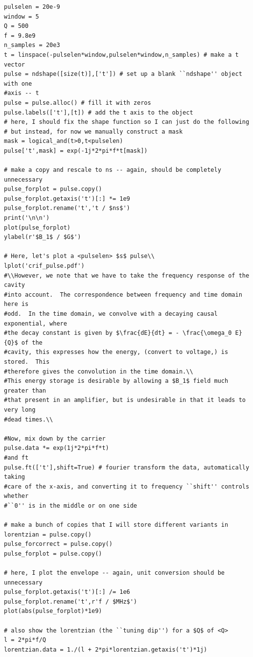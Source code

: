 \begin{lstlisting}
pulselen = 20e-9
window = 5 
Q = 500
f = 9.8e9
n_samples = 20e3
t = linspace(-pulselen*window,pulselen*window,n_samples) # make a t vector
pulse = ndshape([size(t)],['t']) # set up a blank ``ndshape'' object with one
#axis -- t
pulse = pulse.alloc() # fill it with zeros
pulse.labels(['t'],[t]) # add the t axis to the object
# here, I should fix the shape function so I can just do the following
# but instead, for now we manually construct a mask
mask = logical_and(t>0,t<pulselen)
pulse['t',mask] = exp(-1j*2*pi*f*t[mask])

# make a copy and rescale to ns -- again, should be completely unnecessary
pulse_forplot = pulse.copy()
pulse_forplot.getaxis('t')[:] *= 1e9
pulse_forplot.rename('t','t / $ns$')
print('\n\n')
plot(pulse_forplot)
ylabel(r'$B_1$ / $G$')

# Here, let's plot a <pulselen> $s$ pulse\\
lplot('crif_pulse.pdf')
#\\However, we note that we have to take the frequency response of the cavity
#into account.  The correspondence between frequency and time domain here is
#odd.  In the time domain, we convolve with a decaying causal exponential, where
#the decay constant is given by $\frac{dE}{dt} = - \frac{\omega_0 E}{Q}$ of the
#cavity, this expresses how the energy, (convert to voltage,) is stored.  This
#therefore gives the convolution in the time domain.\\
#This energy storage is desirable by allowing a $B_1$ field much greater than
#that present in an amplifier, but is undesirable in that it leads to very long
#dead times.\\

#Now, mix down by the carrier
pulse.data *= exp(1j*2*pi*f*t)
#and ft
pulse.ft(['t'],shift=True) # fourier transform the data, automatically taking
#care of the x-axis, and converting it to frequency ``shift'' controls whether
#``0'' is in the middle or on one side

# make a bunch of copies that I will store different variants in
lorentzian = pulse.copy()
pulse_forcorrect = pulse.copy()
pulse_forplot = pulse.copy()

# here, I plot the envelope -- again, unit conversion should be unnecessary
pulse_forplot.getaxis('t')[:] /= 1e6
pulse_forplot.rename('t',r'f / $MHz$')
plot(abs(pulse_forplot)*1e9)

# also show the lorentzian (the ``tuning dip'') for a $Q$ of <Q>
l = 2*pi*f/Q
lorentzian.data = 1./(l + 2*pi*lorentzian.getaxis('t')*1j)


\end{lstlisting}
